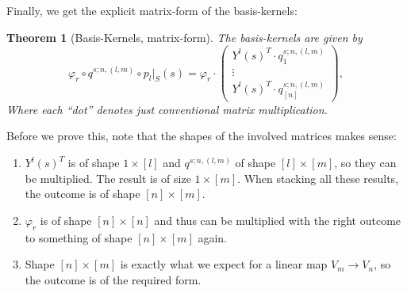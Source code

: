 \documentclass[12pt, a4paper]{article}
\theoremstyle{plain}
\newtheorem{thm}[pro]{Theorem}
\theoremstyle{definition}
\theoremstyle{remark}
\begin{document}
Finally, we get the explicit matrix-form of the basis-kernels:

\begin{thm}[Basis-Kernels, matrix-form]\label{matrix-form}
The basis-kernels are given by
\begin{equation*}
\varphi_r \circ q^{s;n,(l,m)} \circ p_l|_S(s) = \varphi_r \cdot \begin{pmatrix} 
Y^l(s)^T \cdot q_1^{s;n,(l,m)} \\
\vdots \\
Y^l(s)^T \cdot q_{[n]}^{s;n,(l,m)}
\end{pmatrix},
\end{equation*}
Where each ``dot'' denotes just conventional matrix multiplication.
\end{thm}

Before we prove this, note that the shapes of the involved matrices makes sense:
\begin{enumerate}
\item $Y^l(s)^T$ is of shape $1 \times [l]$ and $q^{s;n,(l,m)}$ of shape $[l] \times [m]$, so they can be multiplied. The result is of size $1 \times [m]$. When stacking all these results, the outcome is of shape $[n] \times [m]$.
\item $\varphi_r$ is of shape $[n] \times [n]$ and thus can be multiplied with the right outcome to something of shape $[n] \times [m]$ again.
\item Shape $[n] \times [m]$ is exactly what we expect for a linear map $V_m \to V_n$, so the outcome is of the required form.
\end{enumerate}
\end{document}
